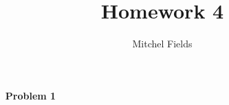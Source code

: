 \documentclass{article}
\title{Homework 4}
\author{Mitchel Fields}
\begin{document}
\maketitle

\begin{itemize}
	\item [\textbf{Problem 1}]
\end{itemize}
\end{document}
